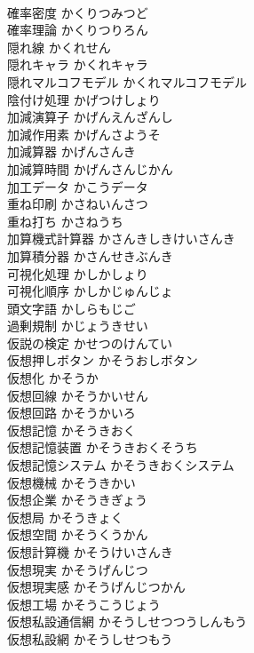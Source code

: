 \documentclass[8pt]{extreport}
\begin{document}
\begin{CJK}{UTF8}{min}
\\	確率密度	かくりつみつど	
\\	確率理論	かくりつりろん	
\\	隠れ線	かくれせん	
\\	隠れキャラ	かくれキャラ	
\\	隠れマルコフモデル	かくれマルコフモデル	
\\	陰付け処理	かげつけしょり	
\\	加減演算子	かげんえんざんし	
\\	加減作用素	かげんさようそ	
\\	加減算器	かげんさんき	
\\	加減算時間	かげんさんじかん	
\\	加工データ	かこうデータ	
\\	重ね印刷	かさねいんさつ	
\\	重ね打ち	かさねうち	
\\	加算機式計算器	かさんきしきけいさんき	
\\	加算積分器	かさんせきぶんき	
\\	可視化処理	かしかしょり	
\\	可視化順序	かしかじゅんじょ	
\\	頭文字語	かしらもじご	
\\	過剰規制	かじょうきせい	
\\	仮説の検定	かせつのけんてい	
\\	仮想押しボタン	かそうおしボタン	
\\	仮想化	かそうか	
\\	仮想回線	かそうかいせん	
\\	仮想回路	かそうかいろ	
\\	仮想記憶	かそうきおく	
\\	仮想記憶装置	かそうきおくそうち	
\\	仮想記憶システム	かそうきおくシステム	
\\	仮想機械	かそうきかい	
\\	仮想企業	かそうきぎょう	
\\	仮想局	かそうきょく	
\\	仮想空間	かそうくうかん	
\\	仮想計算機	かそうけいさんき	
\\	仮想現実	かそうげんじつ	
\\	仮想現実感	かそうげんじつかん	
\\	仮想工場	かそうこうじょう	
\\	仮想私設通信網	かそうしせつつうしんもう	
\\	仮想私設網	かそうしせつもう	

\end{CJK}
\end{document}
